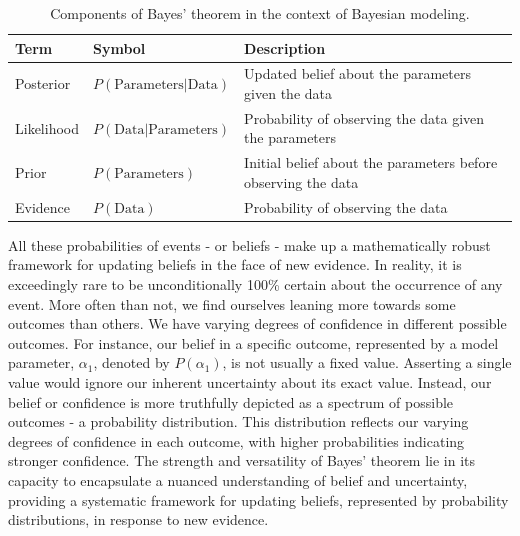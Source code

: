 \begin{table}[h]
\caption{Components of Bayes' theorem in the context of Bayesian modeling.}
\label{tab:bayes_theorem}
\centering
\begin{tabular}{lll}
\toprule
Term & Symbol & Description \\
\midrule
Posterior & $P(\text{Parameters}|\text{Data})$ & Updated belief about the parameters given the data \\
Likelihood & $P(\text{Data}|\text{Parameters})$ & Probability of observing the data given the parameters \\
Prior & $P(\text{Parameters})$ & Initial belief about the parameters before observing the data \\
Evidence & $P(\text{Data})$ & Probability of observing the data \\
\bottomrule
\end{tabular}
\end{table}
All these probabilities of events - or beliefs - make up a mathematically
robust framework for updating beliefs in the face of new evidence. 
In reality, it is exceedingly rare to be unconditionally 100\% certain about the
occurrence of any event. More often than not, we find ourselves leaning more
towards some outcomes than others. We have varying degrees of confidence in
different possible outcomes. For instance, our belief in a specific outcome,
represented by a model parameter, $\alpha_1$, denoted by $P(\alpha_1)$, is not
usually a fixed value. Asserting a single value would ignore our inherent
uncertainty about its exact value.
Instead, our belief or confidence is more truthfully depicted as a spectrum of
possible outcomes - a probability distribution. This distribution reflects our
varying degrees of confidence in each outcome, with higher probabilities
indicating stronger confidence.
The strength and versatility of Bayes' theorem lie in its capacity to
encapsulate a nuanced understanding of belief and uncertainty, providing a
systematic framework for updating beliefs, represented by probability
distributions, in response to new evidence.

